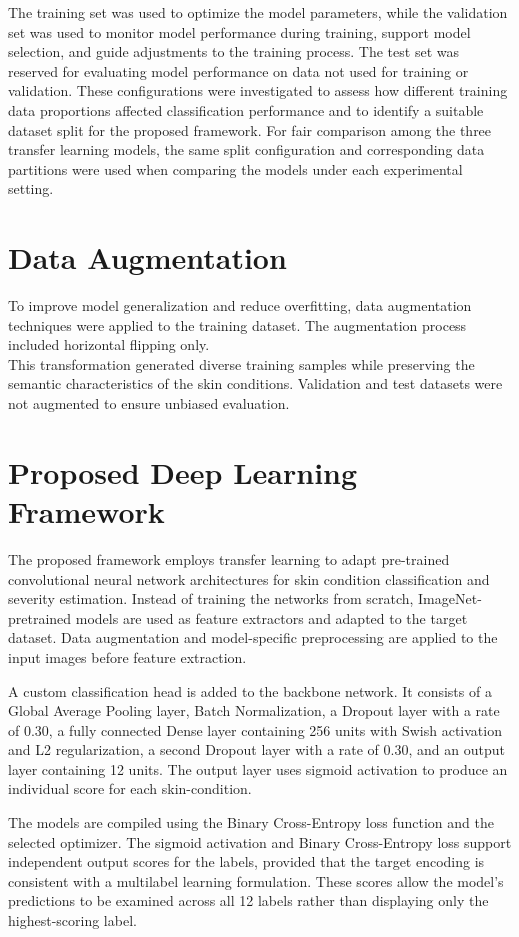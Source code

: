 The training set was used to optimize the model parameters, while the validation set was used to monitor model performance during training, support model selection, and guide adjustments to the training process. The test set was reserved for evaluating model performance on data not used for training or validation. These configurations were investigated to assess how different training data proportions affected classification performance and to identify a suitable dataset split for the proposed framework. For fair comparison among the three transfer learning models, the same split configuration and corresponding data partitions were used when comparing the models under each experimental setting.


\section{Data Augmentation}
To improve model generalization and reduce overfitting, data augmentation techniques were applied to the training dataset. The augmentation process included horizontal flipping only.\\
This transformation generated diverse training samples while preserving the semantic characteristics of the skin conditions. Validation and test datasets were not augmented to ensure unbiased evaluation.

\section{Proposed Deep Learning Framework}
The proposed framework employs transfer learning to adapt pre-trained convolutional neural network architectures for skin condition classification and severity estimation. Instead of training the networks from scratch, ImageNet-pretrained models are used as feature extractors and adapted to the target dataset. Data augmentation and model-specific preprocessing are applied to the input images before feature extraction.

A custom classification head is added to the backbone network. It consists of a Global Average Pooling layer, Batch Normalization, a Dropout layer with a rate of 0.30, a fully connected Dense layer containing 256 units with Swish activation and L2 regularization, a second Dropout layer with a rate of 0.30, and an output layer containing 12 units. The output layer uses sigmoid activation to produce an individual score for each skin-condition.

The models are compiled using the Binary Cross-Entropy loss function and the selected optimizer. The sigmoid activation and Binary Cross-Entropy loss support independent output scores for the labels, provided that the target encoding is consistent with a multilabel learning formulation. These scores allow the model's predictions to be examined across all 12 labels rather than displaying only the highest-scoring label.


